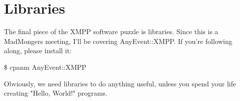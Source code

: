 \section{Libraries}

\pause
The final piece of the XMPP software puzzle is libraries.  Since this is a MadMongers meeting, I'll be covering AnyEvent::XMPP.
If you're following along, please install it:

\pause

\begin{shaded}
\$ cpanm AnyEvent::XMPP
\end{shaded}

\pause

Obviously, we need libraries to do anything useful, unless you spend your life creating "Hello, World!" programs.
